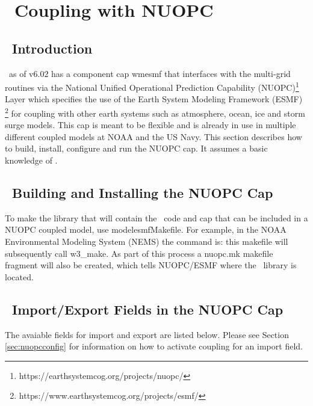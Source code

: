 \pagestyle{myheadings} \setcounter{page}{1} \setcounter{footnote}{0}

\section{~Coupling with NUOPC} \label{app:nuopc}
\newcounters

\vssub
\subsection{~Introduction} \label{sec:nuopcintro}
\vssub

\ws\ as of v6.02 has a component cap {\code wmesmf} that interfaces with the multi-grid routines via the 
National Unified Operational Prediction Capability (NUOPC)\footnote{https://earthsystemcog.org/projects/nuopc/}
Layer which specifies the use of the Earth System Modeling Framework (ESMF)
\footnote{https://www.earthsystemcog.org/projects/esmf/}   
for coupling with other earth systems such as atmosphere, ocean, ice and storm surge models. 
This cap is meant to be flexible and is already in use in multiple different coupled models at NOAA and the US Navy. 
This section describes how to build, install, configure and run the NUOPC cap.  It assumes a basic knowledge of \ws. 

\vssub
\subsection{~Building and Installing the NUOPC Cap} \label{sec:nuopcbuild}
\vssub

To make the library that will contain the \ws\ code and cap that can be included in a NUOPC coupled model, use
{\code model\/esmf\/Makefile}.  For example, in the NOAA Environmental Modeling System (NEMS) the command is: 
this makefile will subsequently call {\code w3\_make}. As part of this process a nuopc.mk makefile
fragment will also be created, which tells NUOPC/ESMF where the \ws\ library is located. 

\vssub
\subsection{~Import/Export Fields in the NUOPC Cap} \label{sec:nuopcfields}
\vssub

The avaiable fields for import and export are listed below.  Please see Section \ref{sec:nuopcconfig} for 
information on how to activate coupling for an import field. 

